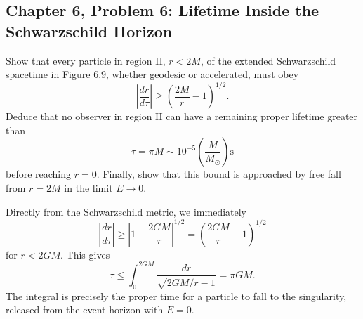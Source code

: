 \subsection{Chapter 6, Problem 6: Lifetime Inside the Schwarzschild Horizon}

Show that every particle in region II, $r<2M$, of the extended Schwarzschild
spacetime in Figure 6.9, whether geodesic or accelerated, must obey
\begin{equation}
    \left|\frac{dr}{d\tau}\right|
    \geq\left(\frac{2M}{r}-1\right)^{1/2}.
\end{equation}
Deduce that no observer in region II can have a remaining proper lifetime greater
than
    \begin{equation}
        \tau=\pi M
        \sim 10^{-5}\left(\frac{M}{M_\odot}\right)\mathrm{s}
    \end{equation}
before reaching $r=0$. Finally, show that this bound is approached by free fall
from $r=2M$ in the limit $E\to0$.
\begin{solution}
    Directly from the Schwarzschild metric, we immediately
    \begin{equation}
        \left|\frac{dr}{d\tau}\right| \geq \left|1-\frac{2GM}{r}\right|^{1/2} = \left(\frac{2GM}{r}- 1\right)^{1/2}
    \end{equation}
    for $r < 2GM$. This gives
    \begin{equation}
        \tau \leq \int_0^{2GM}\frac{dr}{\sqrt{2GM/r-1}} = \pi GM.
    \end{equation}
    The integral is precisely the proper time for a particle to fall to the singularity, released from the event horizon with $ E = 0$.
\end{solution}
